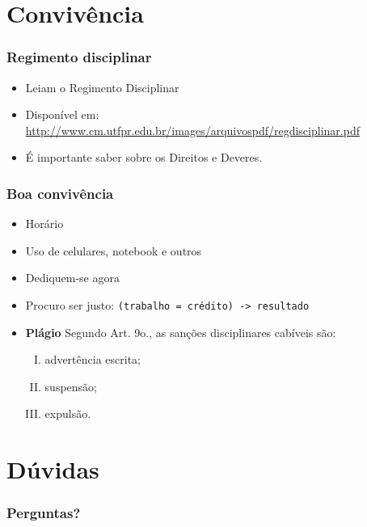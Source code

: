 \documentclass{beamer}
\begin{document}
\section[Convivência]{Convivência}
\begin{frame}
	\frametitle{Regimento disciplinar}
	\fontsize{14pt}{7.2}\selectfont
	\begin{minipage}[t][\textheight][t]{\textwidth}
		\begin{itemize}
			\item Leiam o Regimento Disciplinar
			\item {Disponível em: \url{http://www.cm.utfpr.edu.br/images/arquivospdf/regdisciplinar.pdf}}
			\item É importante saber sobre os Direitos e Deveres.
		\end{itemize}
	\end{minipage}
\end{frame}
\begin{frame}
	\frametitle{Boa convivência}
	\fontsize{14pt}{7.2}\selectfont
	\begin{minipage}[t][\textheight][t]{\textwidth}
		\begin{itemize}
			\item  Horário
			\item  Uso de celulares, notebook e outros
			\item  Dediquem-se agora
			\item  Procuro ser justo: \texttt{(trabalho = crédito) -> resultado}
			\item  \textbf{Plágio}
			Segundo Art. 9o., as sanções disciplinares cabíveis são:
			\begin{enumerate}[I.]
				\item advertência escrita;
				\item suspensão;
				\item expulsão.
			\end{enumerate}
		\end{itemize}
	\end{minipage}
\end{frame}
\section[Dúvidas]{Dúvidas}
\begin{frame}
	\frametitle{Perguntas?}
	\fontsize{14pt}{7.2}\selectfont
	\begin{minipage}[t][\textheight][t]{\textwidth}
		
	\end{minipage}
\end{frame}
\end{document}
